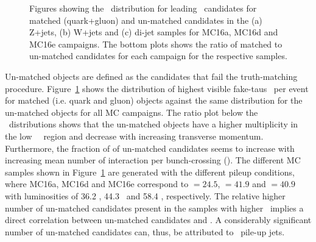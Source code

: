 	\begin{figure}[!hbt]
		\begin{center}
			\hspace{0.03\textwidth}
			\hspace{0.03\textwidth}
			\hspace{0.03\textwidth}
		\end{center}
		\caption{Figures showing the \pt\ distribution for leading \htau\ candidates for matched (quark+gluon) and un-matched candidates in the (a) Z+jets, (b) W+jets and (c) di-jet samples for MC16a, MC16d and MC16e campaigns. The bottom plots shows the ratio of matched to un-matched candidates for each campaign for the respective samples.}
	\label{fig:mc16aVSmc16dVSmc16e}
	\end{figure}		
	Un-matched objects are defined as the candidates that fail the truth-matching procedure. Figure~\ref{fig:mc16aVSmc16dVSmc16e} shows the distribution of highest visible fake-taus \pt\ per event for matched (i.e. quark and gluon) objects against the same distribution for the un-matched objects for all \ac{MC} campaigns. 
	The ratio plot below the \pt\ distributions shows that the un-matched objects have a higher multiplicity in the low \htau\ \pt\ region and decrease with increasing transverse momentum. 
	Furthermore, the fraction of of un-matched candidates seems to increase with increasing mean number of interaction per bunch-crossing (\mubar). The different \ac{MC} samples shown in Figure~\ref{fig:mc16aVSmc16dVSmc16e} are generated with the different pileup conditions, where MC16a, MC16d and MC16e correspond to \mubar$=24.5$, \mubar$=41.9$ and \mubar$=40.9$ with luminosities of 36.2 \fb , 44.3 \fb\ and 58.4 \fb , respectively. 
	The relative higher number of un-matched candidates present in the samples with higher \mubar\ implies a direct correlation between un-matched candidates and \mubar. A considerably significant number of un-matched candidates can, thus, be attributed to \ftau\ pile-up jets.
	
